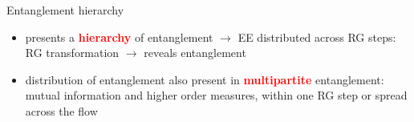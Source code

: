\documentclass[12pt,aspectratio=169]{beamer}
\newcommand{\focus}[1]{\textcolor{red}{\bf{#1}}}
\begin{document}
\begin{frame}{Entanglement hierarchy}
\vspace*{\fill}

\begin{itemize}
	\item 
presents a \focus{hierarchy} of entanglement \(\longrightarrow\) EE distributed across RG steps:\\[10pt]
RG transformation \(\longrightarrow\) reveals entanglement

\vspace*{\fill}
\item distribution of entanglement also present in \focus{multipartite} entanglement:\\[10pt]
	mutual information and higher order measures, within one RG step or spread across the flow
\end{itemize}

\end{frame}
\end{document}
